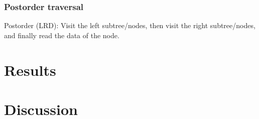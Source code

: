 \documentclass[a4paper, 11pt]{article}
\begin{document}


    \subsubsection*{Postorder traversal}
    Postorder (LRD): Visit the left subtree/nodes, then visit the right
    subtree/nodes, and finally read the data of the node.
    
    


    \section*{Results}
    \label{sec:results}
    \section*{Discussion}
    \label{sec:discussion}
\end{document}
